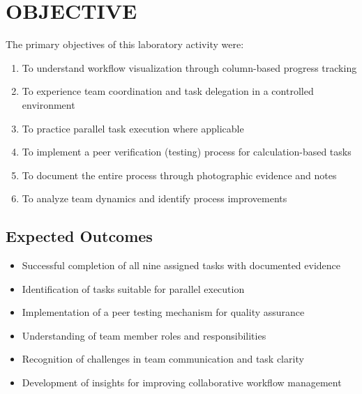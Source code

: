 \chapter{OBJECTIVE}\label{obj}

The primary objectives of this laboratory activity were:

\begin{enumerate}
    \item To understand workflow visualization through column-based progress tracking
    \item To experience team coordination and task delegation in a controlled environment
    \item To practice parallel task execution where applicable
    \item To implement a peer verification (testing) process for calculation-based tasks
    \item To document the entire process through photographic evidence and notes
    \item To analyze team dynamics and identify process improvements
\end{enumerate}



\section{Expected Outcomes}
\begin{itemize}
    \item Successful completion of all nine assigned tasks with documented evidence
    \item Identification of tasks suitable for parallel execution
    \item Implementation of a peer testing mechanism for quality assurance
    \item Understanding of team member roles and responsibilities
    \item Recognition of challenges in team communication and task clarity
    \item Development of insights for improving collaborative workflow management
\end{itemize}


